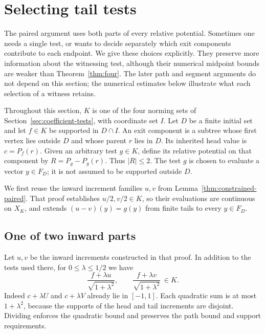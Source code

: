 \section{Selecting tail tests}
\label{sec:selections}

The paired argument uses both parts of every relative potential. Sometimes
one needs a single test, or wants to decide separately which exit components
contribute to each endpoint. We give these choices explicitly. They preserve
more information about the witnessing test, although their numerical midpoint
bounds are weaker than Theorem~\ref{thm:four}. The later path and segment
arguments do not depend on this section; the numerical estimates below
illustrate what each selection of a witness retains.

Throughout this section, $K$ is one of the four norming sets of
Section~\ref{sec:coefficient-tests}, with coordinate set $I$.
Let $D$ be a finite initial set and let $f\in K$ be supported in
$D\cap I$. An exit component is a subtree whose first vertex lies
outside $D$ and whose parent $r$ lies in $D$. Its inherited head value
is $c=P_f(r)$. Given an arbitrary test $g\in K$, define its relative
potential on that component by $R=P_g-P_g(r)$. Thus $|R|\le2$.
The test $g$ is chosen to evaluate a vector $y\in F_D$; it is not
assumed to be supported outside $D$.

We first reuse the inward increment families $u,v$ from
Lemma~\ref{thm:constrained-paired}. That proof establishes
$u/2,v/2\in K$, so their evaluations are continuous on $X_K$, and
extends $(u-v)(y)=g(y)$ from finite tails to every $y\in F_D$.

\subsection{One of two inward parts}
\label{sec:two-part-selection}

Let $u,v$ be the inward increments constructed in that proof. In addition
to the tests used there, for $0\le\lambda\le1/2$ we have
\begin{equation}\label{eq:normalized-inward}
 \frac{f+\lambda u}{\sqrt{1+\lambda^2}},\qquad
 \frac{f+\lambda v}{\sqrt{1+\lambda^2}}\ \in K.
\end{equation}
Indeed $c+\lambda U$ and $c+\lambda V$ already lie in $[-1,1]$.
Each quadratic sum is at most $1+\lambda^2$, because the supports of
the head and tail increments are disjoint. Dividing enforces the
quadratic bound and preserves the path bound and support requirements.

